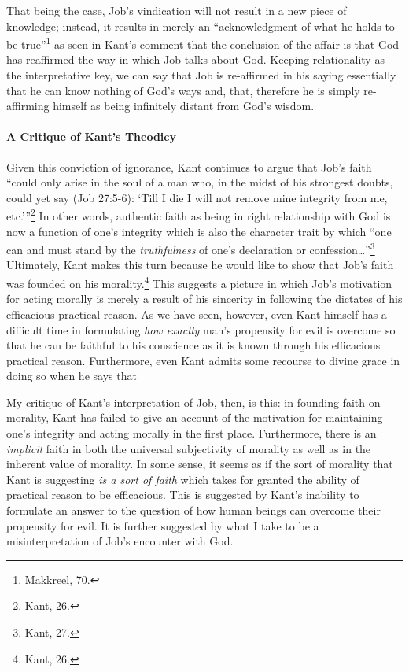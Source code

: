 \documentclass[12pt]{article}
\begin{document}
	That being the case, Job's vindication will not result in a new piece of knowledge; instead, it results in merely an ``acknowledgment of what he holds to be true''\footnote{Makkreel, 70.} as seen in Kant's comment that the conclusion of the affair is that God has reaffirmed the way in which Job talks about God. Keeping relationality as the interpretative key, we can say that Job is re-affirmed in his saying essentially that he can know nothing of God's ways and, that, therefore he is simply re-affirming himself as being infinitely distant from God's wisdom. 
	
	\paragraph*{A Critique of Kant's Theodicy} Given this conviction of ignorance, Kant continues to argue that Job's faith ``could only arise in the soul of a man who, in the midst of his strongest doubts, could yet say (Job 27:5-6): `Till I die I will not remove mine integrity from me, etc.'\thinspace''\footnote{Kant, 26.} In other words, authentic faith as being in right relationship with God is now a function of one's integrity which is also the character trait by which ``one can and must stand by the \emph{truthfulness} of one's declaration or confession\ldots''\footnote{Kant, 27.} Ultimately, Kant makes this turn because he would like to show that Job's faith was founded on his morality.\footnote{Kant, 26.} This suggests a picture in which Job's motivation for acting morally is merely a result of his sincerity in following the dictates of his efficacious practical reason. As we have seen, however, even Kant himself has a difficult time in formulating \emph{how exactly} man's propensity for evil is overcome so that he can be faithful to his conscience as it is known through his efficacious practical reason. Furthermore, even Kant admits some recourse to divine grace in doing so when he says that 
	
	My critique of Kant's interpretation of Job, then, is this: in founding faith on morality, Kant has failed to give an account of the motivation for maintaining one's integrity and acting morally in the first place. Furthermore, there is an \emph{implicit} faith in both the universal subjectivity of morality as well as in the inherent value of morality. In some sense, it seems as if the sort of morality that Kant is suggesting \emph{is a sort of faith} which takes for granted the ability of practical reason to be efficacious. This is suggested by Kant's inability to formulate an answer to the question of how human beings can overcome their propensity for evil. It is further suggested by what I take to be a misinterpretation of Job's encounter with God.
	
\end{document}
